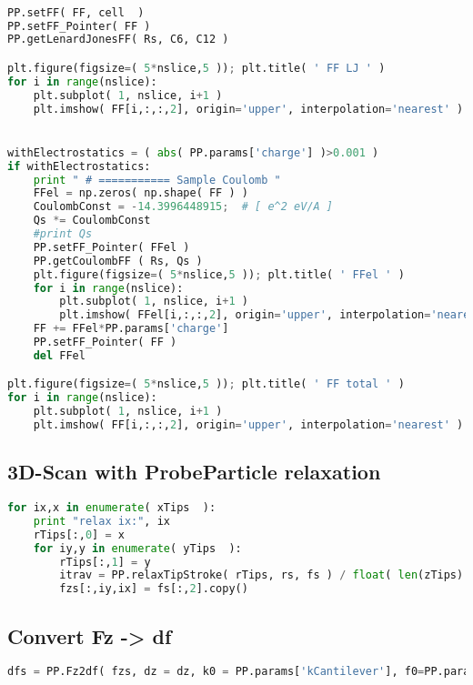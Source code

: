 \begin{shadedbox}
    \begin{lstlisting}[language=python]

PP.setFF( FF, cell  )
PP.setFF_Pointer( FF )
PP.getLenardJonesFF( Rs, C6, C12 )

plt.figure(figsize=( 5*nslice,5 )); plt.title( ' FF LJ ' )
for i in range(nslice):
    plt.subplot( 1, nslice, i+1 )
    plt.imshow( FF[i,:,:,2], origin='upper', interpolation='nearest' )


withElectrostatics = ( abs( PP.params['charge'] )>0.001 )
if withElectrostatics:
    print " # =========== Sample Coulomb "
    FFel = np.zeros( np.shape( FF ) )
    CoulombConst = -14.3996448915;  # [ e^2 eV/A ]
    Qs *= CoulombConst
    #print Qs
    PP.setFF_Pointer( FFel )
    PP.getCoulombFF ( Rs, Qs )
    plt.figure(figsize=( 5*nslice,5 )); plt.title( ' FFel ' )
    for i in range(nslice):
        plt.subplot( 1, nslice, i+1 )
        plt.imshow( FFel[i,:,:,2], origin='upper', interpolation='nearest' )
    FF += FFel*PP.params['charge']
    PP.setFF_Pointer( FF )
    del FFel

plt.figure(figsize=( 5*nslice,5 )); plt.title( ' FF total ' )
for i in range(nslice):
    plt.subplot( 1, nslice, i+1 )
    plt.imshow( FF[i,:,:,2], origin='upper', interpolation='nearest' )
   \end{lstlisting}
\end{shadedbox}

\subsection{3D-Scan with ProbeParticle relaxation}
\begin{shadedbox}
    \begin{lstlisting}[language=python]
for ix,x in enumerate( xTips  ):
    print "relax ix:", ix
    rTips[:,0] = x
    for iy,y in enumerate( yTips  ):
        rTips[:,1] = y
        itrav = PP.relaxTipStroke( rTips, rs, fs ) / float( len(zTips) )
        fzs[:,iy,ix] = fs[:,2].copy()
    \end{lstlisting}
\end{shadedbox}



\subsection{Convert Fz -> df}
\begin{shadedbox}
    \begin{lstlisting}[language=python]
dfs = PP.Fz2df( fzs, dz = dz, k0 = PP.params['kCantilever'], f0=PP.params['f0Cantilever'], n=int(PP.params['Amplitude']/dz) )
    \end{lstlisting}
\end{shadedbox}




